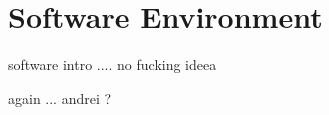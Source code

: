 \normalfont\normalsize
\chapter{Software Environment}

software intro .... no fucking ideea 

 

again ... andrei ?



\clearpage
 
